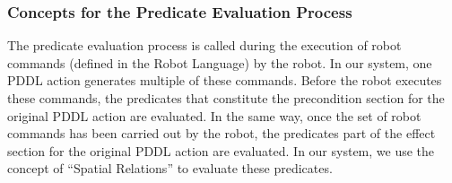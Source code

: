 \subsubsection{Concepts for the Predicate Evaluation Process}
The predicate evaluation process is called during the execution of robot commands (defined in the Robot Language) by the robot. In our system, one PDDL action generates multiple of these commands. Before the robot executes these commands, the predicates that constitute the precondition section for the original PDDL action are evaluated. In the same way, once the set of robot commands has been carried out by the robot, the predicates part of the effect section for the original PDDL action are evaluated. In our system, we use the concept of ``Spatial Relations'' to evaluate these predicates.

